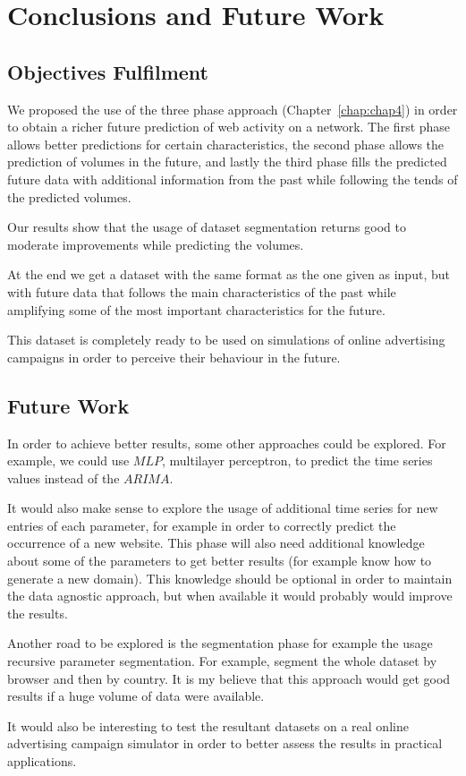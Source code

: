 \chapter{Conclusions and Future Work} \label{chap:concl}

\section*{}

\section{Objectives Fulfilment}

We proposed the use of the three phase approach (Chapter~\ref{chap:chap4}) in
order to obtain a richer future prediction of web activity on a network.
The first phase allows better predictions for certain characteristics,
the second phase allows the prediction of volumes in the future, and lastly the third
phase fills the predicted future data with additional information from the past
while following
the tends of the predicted volumes.

Our results show that the usage of dataset segmentation returns good to moderate
improvements while predicting the volumes.

At the end we get a dataset with the same format as the one given as input, but with future
data that follows the main characteristics of the past while amplifying some of the
most important characteristics for the future.

This dataset is completely ready to be used on simulations of online advertising
campaigns in order to perceive their behaviour in the future.

\section{Future Work}

In order to achieve better results, some other approaches could be explored. For
example, we could use $MLP$, multilayer perceptron, to predict the time series values
instead of the $ARIMA$.

It would also make sense to explore the usage of additional time series for new
entries of each parameter, for example in order to correctly predict the occurrence of a new
website. This phase will also need additional knowledge about
some of the parameters to get better results (for example know how to generate a
new domain). This knowledge should be optional in order to maintain the data
agnostic approach, but when available it would probably would improve the results.

Another road to be explored is the segmentation phase for example the usage
recursive parameter segmentation. For example, segment the whole dataset by
browser and then by country. It is my believe that this approach would get good
results if a huge volume of data were available.

It would also be interesting to test the resultant datasets on a real online
advertising campaign simulator in order to better assess the results in practical
applications.

